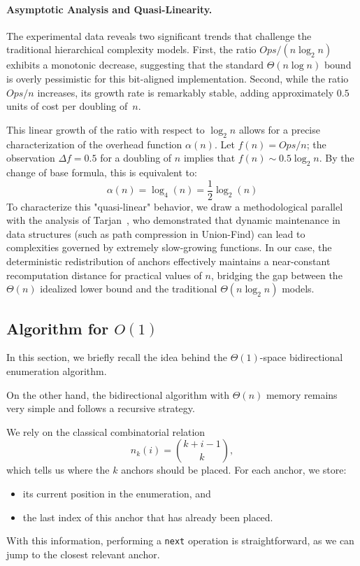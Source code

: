 \documentclass[a4paper,10pt]{article}
\begin{document}
\paragraph{Asymptotic Analysis and Quasi-Linearity.}
The experimental data reveals two significant trends that challenge the traditional hierarchical complexity models. First, the ratio \(Ops / (n \log_2 n)\) exhibits a monotonic decrease, suggesting that the standard \(\Theta(n \log n)\) bound is overly pessimistic for this bit-aligned implementation. Second, while the ratio \(Ops / n\) increases, its growth rate is remarkably stable, adding approximately \(0.5\) units of cost per doubling of~\(n\).

This linear growth of the ratio with respect to \(\log_2 n\) allows for a precise characterization of the overhead function \(\alpha(n)\). Let \(f(n) = Ops/n\); the observation \(\Delta f = 0.5\) for a doubling of \(n\) implies that \(f(n) \sim 0.5 \log_2 n\). By the change of base formula, this is equivalent to:
\[
\alpha(n) = \log_4(n) = \frac{1}{2} \log_2(n)
\]
To characterize this "quasi-linear" behavior, we draw a methodological parallel with the analysis of Tarjan~\cite{tarjan1975efficiency}, who demonstrated that dynamic maintenance in data structures (such as path compression in Union-Find) can lead to complexities governed by extremely slow-growing functions. In our case, the deterministic redistribution of anchors effectively maintains a near-constant recomputation distance for practical values of \(n\), bridging the gap between the \(\Theta(n)\) idealized lower bound and the traditional \(\Theta(n \log_2 n)\) models.
\subsection{Algorithm for $O(1)$}

In this section, we briefly recall the idea behind the $\Theta(1)$-space bidirectional enumeration algorithm.  
\medskip

On the other hand, the bidirectional algorithm with $\Theta(n)$ memory remains very simple and follows a recursive strategy.

We rely on the classical combinatorial relation
\[
  n_k(i) = \binom{k + i - 1}{k},
\]
which tells us where the $k$ anchors should be placed.  
For each anchor, we store:
\begin{itemize}
    \item its current position in the enumeration, and
    \item the last index of this anchor that has already been placed.
\end{itemize}
With this information, performing a \texttt{next} operation is straightforward, as we can jump to the closest relevant anchor.
\end{document}

